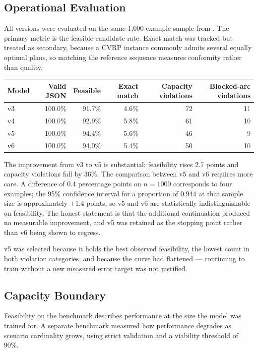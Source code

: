 \documentclass[11pt,a4paper]{article}
\newcommand{\toprule}{\hline}
\newcommand{\midrule}{\hline}
\newcommand{\bottomrule}{\hline}
\begin{document}
\subsection{Operational Evaluation}

All versions were evaluated on the same 1,000-example sample from
. The primary metric is the feasible-candidate
rate. Exact match was tracked but treated as secondary, because a CVRP instance commonly admits
several equally optimal plans, so matching the reference sequence measures conformity rather than
quality.

\begin{table}[h]
\centering
\begin{tabular}{lrrrrr}
\toprule
Model & Valid JSON & Feasible & Exact match & Capacity violations & Blocked-arc violations \\
\midrule
v3 & 100.0\% & 91.7\% & 4.6\% & 72 & 11 \\
v4 & 100.0\% & 92.9\% & 5.8\% & 61 & 10 \\
v5 & 100.0\% & 94.4\% & 5.6\% & 46 & 9 \\
v6 & 100.0\% & 94.0\% & 5.4\% & 50 & 10 \\
\bottomrule
\end{tabular}
\end{table}

The improvement from v3 to v5 is substantial: feasibility rises 2.7 points and capacity violations
fall by 36\%. The comparison between v5 and v6 requires more care. A difference of 0.4 percentage
points on $n = 1000$ corresponds to four examples; the 95\% confidence interval for a proportion of
0.944 at that sample size is approximately $\pm 1.4$ points, so v5 and v6 are statistically
indistinguishable on feasibility. The honest statement is that the additional continuation produced
no measurable improvement, and v5 was retained as the stopping point rather than v6 being shown to
regress.

v5 was selected because it holds the best observed feasibility, the lowest count in both violation
categories, and because the curve had flattened --- continuing to train without a new measured error
target was not justified.

\subsection{Capacity Boundary}
\label{sec:capacity}

Feasibility on the benchmark describes performance at the size the model was trained for. A separate
benchmark measured how performance degrades as scenario cardinality grows, using strict validation
and a viability threshold of 90\%.
\end{document}
